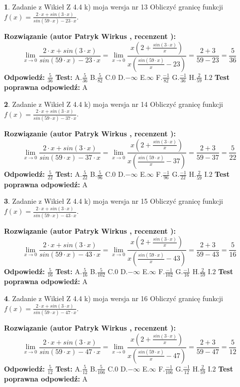\documentclass[12pt, a4paper]{article}
\theoremstyle{definition} %
\newtheorem{zad}{}
\newcommand{\zadStart}[1]{\begin{zad}#1\newline}
\newcommand{\zadStop}{\end{zad}}
\newcommand{\rozwStart}[2]{\noindent \textbf{Rozwiązanie (autor #1 , recenzent #2): }\newline}
\newcommand{\rozwStop}{\newline}
\newcommand{\odpStart}{\noindent \textbf{Odpowiedź:}\newline}
\newcommand{\odpStop}{\newline}
\newcommand{\testStart}{\noindent \textbf{Test:}\newline}
\newcommand{\testStop}{\newline}
\newcommand{\kluczStart}{\noindent \textbf{Test poprawna odpowiedź:}\newline}
\newcommand{\kluczStop}{\newline}
\begin{document}
\zadStart{Zadanie z Wikieł Z 4.4 k) moja wersja nr 13}
Obliczyć granicę funkcji $f(x)=\frac{2\cdot x +sin(3\cdot x)}{sin(59\cdot x) -23\cdot x}$.
\zadStop
\rozwStart{Patryk Wirkus}{}
$$\lim\limits_{x\to 0}\frac{2\cdot x +sin(3\cdot x)}{sin(59\cdot x) -23\cdot x}
=\lim\limits_{x\to 0}\frac{x(2+\frac{sin(3\cdot x)}{x})}{x(\frac{sin(59\cdot x)}{x}-23)}
=\frac{2+3}{59-23} = \frac{5}{36}$$
\rozwStop
\odpStart
$\frac{5}{36}$
\odpStop
\testStart
A.$\frac{5}{36}$
B.$\frac{5}{82}$
C.$0$
D.$-\infty$
E.$\infty$
F.$\frac{-1}{82}$
G.$\frac{-1}{36}$
H.$\frac{2}{59}$
I.$2$
\testStop
\kluczStart
A
\kluczStop



\zadStart{Zadanie z Wikieł Z 4.4 k) moja wersja nr 14}
Obliczyć granicę funkcji $f(x)=\frac{2\cdot x +sin(3\cdot x)}{sin(59\cdot x) -37\cdot x}$.
\zadStop
\rozwStart{Patryk Wirkus}{}
$$\lim\limits_{x\to 0}\frac{2\cdot x +sin(3\cdot x)}{sin(59\cdot x) -37\cdot x}
=\lim\limits_{x\to 0}\frac{x(2+\frac{sin(3\cdot x)}{x})}{x(\frac{sin(59\cdot x)}{x}-37)}
=\frac{2+3}{59-37} = \frac{5}{22}$$
\rozwStop
\odpStart
$\frac{5}{22}$
\odpStop
\testStart
A.$\frac{5}{22}$
B.$\frac{5}{96}$
C.$0$
D.$-\infty$
E.$\infty$
F.$\frac{-1}{96}$
G.$\frac{-1}{22}$
H.$\frac{2}{59}$
I.$2$
\testStop
\kluczStart
A
\kluczStop



\zadStart{Zadanie z Wikieł Z 4.4 k) moja wersja nr 15}
Obliczyć granicę funkcji $f(x)=\frac{2\cdot x +sin(3\cdot x)}{sin(59\cdot x) -43\cdot x}$.
\zadStop
\rozwStart{Patryk Wirkus}{}
$$\lim\limits_{x\to 0}\frac{2\cdot x +sin(3\cdot x)}{sin(59\cdot x) -43\cdot x}
=\lim\limits_{x\to 0}\frac{x(2+\frac{sin(3\cdot x)}{x})}{x(\frac{sin(59\cdot x)}{x}-43)}
=\frac{2+3}{59-43} = \frac{5}{16}$$
\rozwStop
\odpStart
$\frac{5}{16}$
\odpStop
\testStart
A.$\frac{5}{16}$
B.$\frac{5}{102}$
C.$0$
D.$-\infty$
E.$\infty$
F.$\frac{-1}{102}$
G.$\frac{-1}{16}$
H.$\frac{2}{59}$
I.$2$
\testStop
\kluczStart
A
\kluczStop



\zadStart{Zadanie z Wikieł Z 4.4 k) moja wersja nr 16}
Obliczyć granicę funkcji $f(x)=\frac{2\cdot x +sin(3\cdot x)}{sin(59\cdot x) -47\cdot x}$.
\zadStop
\rozwStart{Patryk Wirkus}{}
$$\lim\limits_{x\to 0}\frac{2\cdot x +sin(3\cdot x)}{sin(59\cdot x) -47\cdot x}
=\lim\limits_{x\to 0}\frac{x(2+\frac{sin(3\cdot x)}{x})}{x(\frac{sin(59\cdot x)}{x}-47)}
=\frac{2+3}{59-47} = \frac{5}{12}$$
\rozwStop
\odpStart
$\frac{5}{12}$
\odpStop
\testStart
A.$\frac{5}{12}$
B.$\frac{5}{106}$
C.$0$
D.$-\infty$
E.$\infty$
F.$\frac{-1}{106}$
G.$\frac{-1}{12}$
H.$\frac{2}{59}$
I.$2$
\testStop
\kluczStart
A
\kluczStop
\end{document}

